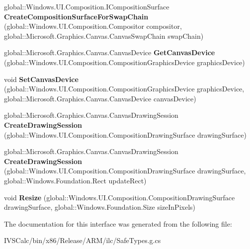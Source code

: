 \begin{DoxyCompactItemize}
global\+::\+Windows.\+U\+I.\+Composition.\+I\+Composition\+Surface {\bfseries Create\+Composition\+Surface\+For\+Swap\+Chain} (global\+::\+Windows.\+U\+I.\+Composition.\+Compositor compositor, global\+::\+Microsoft.\+Graphics.\+Canvas.\+Canvas\+Swap\+Chain swap\+Chain)
\item 
\mbox{\label{interface_microsoft_1_1_graphics_1_1_canvas_1_1_u_i_1_1_composition_1_1_i_canvas_composition_statics_ad6745a005de8b7c161ff1c151591a3bb}} 
global\+::\+Microsoft.\+Graphics.\+Canvas.\+Canvas\+Device {\bfseries Get\+Canvas\+Device} (global\+::\+Windows.\+U\+I.\+Composition.\+Composition\+Graphics\+Device graphics\+Device)
\item 
\mbox{\label{interface_microsoft_1_1_graphics_1_1_canvas_1_1_u_i_1_1_composition_1_1_i_canvas_composition_statics_a3fce2ed9ef29897b92f51b815d0c42d7}} 
void {\bfseries Set\+Canvas\+Device} (global\+::\+Windows.\+U\+I.\+Composition.\+Composition\+Graphics\+Device graphics\+Device, global\+::\+Microsoft.\+Graphics.\+Canvas.\+Canvas\+Device canvas\+Device)
\item 
\mbox{\label{interface_microsoft_1_1_graphics_1_1_canvas_1_1_u_i_1_1_composition_1_1_i_canvas_composition_statics_a742fc5f5398406c730e6f87b2755b86a}} 
global\+::\+Microsoft.\+Graphics.\+Canvas.\+Canvas\+Drawing\+Session {\bfseries Create\+Drawing\+Session} (global\+::\+Windows.\+U\+I.\+Composition.\+Composition\+Drawing\+Surface drawing\+Surface)
\item 
\mbox{\label{interface_microsoft_1_1_graphics_1_1_canvas_1_1_u_i_1_1_composition_1_1_i_canvas_composition_statics_a3be55117be22745ae6372f082447a79b}} 
global\+::\+Microsoft.\+Graphics.\+Canvas.\+Canvas\+Drawing\+Session {\bfseries Create\+Drawing\+Session} (global\+::\+Windows.\+U\+I.\+Composition.\+Composition\+Drawing\+Surface drawing\+Surface, global\+::\+Windows.\+Foundation.\+Rect update\+Rect)
\item 
\mbox{\label{interface_microsoft_1_1_graphics_1_1_canvas_1_1_u_i_1_1_composition_1_1_i_canvas_composition_statics_aa321ab037c7b505b333681f0b3bdc829}} 
void {\bfseries Resize} (global\+::\+Windows.\+U\+I.\+Composition.\+Composition\+Drawing\+Surface drawing\+Surface, global\+::\+Windows.\+Foundation.\+Size size\+In\+Pixels)
\end{DoxyCompactItemize}


The documentation for this interface was generated from the following file\+:\begin{DoxyCompactItemize}
\item 
I\+V\+S\+Calc/bin/x86/\+Release/\+A\+R\+M/ilc/Safe\+Types.\+g.\+cs\end{DoxyCompactItemize}
